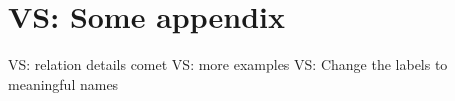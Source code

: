 \documentclass[11pt]{article}
\newcommand{\vs}[1]{\textcolor{blue!40}{VS: #1}}
\begin{document}




\appendix

\section{\vs{Some appendix}}
\label{sec:appendix_whatever}

\vs{relation details comet}
\vs{more examples}
\vs{Change the labels to meaningful names}
\end{document}
